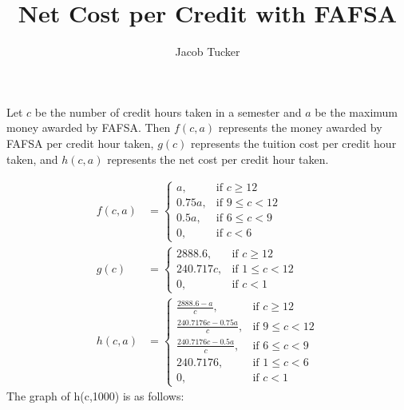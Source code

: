 \documentclass{article}
\title{Net Cost per Credit with FAFSA}
\author{Jacob Tucker}
\begin{document}
\maketitle
\vspace{-0.5cm}

Let $c$ be the number of credit hours taken in a semester and $a$ be the maximum money awarded by FAFSA. Then $f(c,a)$ represents the money awarded by FAFSA per credit hour taken, $g(c)$ represents the tuition cost per credit hour taken, and $h(c,a)$ represents the net cost per credit hour taken. 

\begin{align}
  f(c,a) &= \begin{cases}
      a, &\text{if } c \geq 12 \\
      0.75a, &\text{if } 9 \leq c < 12 \\
      0.5a, &\text{if } 6 \leq c < 9 \\
      0, &\text{if } c < 6
    \end{cases} \\
  g(c) &= \begin{cases}
    2888.6, &\text{if } c \geq 12 \\
    240.717c, &\text{if } 1 \leq c < 12 \\
    0, &\text{if } c < 1 
    \end{cases} \\
  h(c,a) &= \begin{cases}
    \frac{2888.6 - a}{c}, &\text{if } c \geq 12 \\
    \frac{240.7176c - 0.75a}{c}, &\text{if } 9 \leq c < 12 \\
    \frac{240.7176c - 0.5a}{c}, &\text{if } 6 \leq c < 9 \\
    240.7176, &\text{if } 1 \leq c < 6 \\
    0, &\text{if } c < 1
    \end{cases}
\end{align}
The graph of h(c,1000) is as follows: \\ \\
\end{document}
